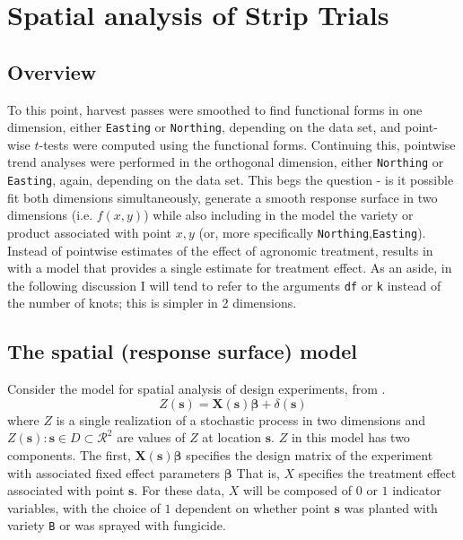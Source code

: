 \documentclass[phdcss]{SDSUThesis}
\begin{document}
\clearpage

\chapter{Spatial analysis of Strip Trials}\label{SpatialAnalysisChapter}

\section{Overview}

To this point, harvest passes were smoothed to find functional forms in one dimension, either \texttt{Easting} or \texttt{Northing}, depending on the data set, and point-wise $t$-tests were computed using the functional forms. Continuing this, pointwise trend analyses were performed in the orthogonal dimension, either \texttt{Northing} or \texttt{Easting}, again, depending on the data set. This begs the question - is it possible fit both dimensions simultaneously, generate a smooth response surface in two dimensions (i.e. $f(x, y)$) while also including in the model the variety or product associated with point $x, y$ (or, more specifically \texttt{Northing},\texttt{Easting}). Instead of pointwise estimates of the effect of agronomic treatment, results in with a model that provides a single estimate for treatment effect. As an aside, in the following discussion I will tend to refer to the arguments \texttt{df} or \texttt{k} instead of the number of knots; this is simpler in 2 dimensions. 

\section{The spatial (response surface) model}

Consider the model for spatial analysis of design experiments, from \cite{schabenberger-2001}.
\begin{equation}
   Z(\mathbf{s}) = \mathbf{X}(\mathbf{s}) \mathbf{\beta} + \delta(\mathbf{s})
\end{equation}
where $Z$ is a single realization of a stochastic process in two dimensions and ${Z(\mathbf{s}) : \mathbf{s} \in D \subset \mathcal{R}^2}$ are values of $Z$ at location $\mathbf{s}$. $Z$ in this model has two components. The first, $\mathbf{X}(\mathbf{s}) \mathbf{\beta}$ specifies the design matrix of the experiment with associated fixed effect parameters $\mathbf{\beta}$ That is, $X$ specifies the treatment effect associated with point $\mathbf{s}$. For these data, $X$ will be composed of $0$ or $1$ indicator variables, with the choice of $1$ dependent on whether point $\mathbf{s}$ was planted with variety \texttt{B} or was sprayed with fungicide.
\end{document}
